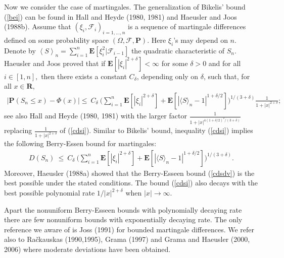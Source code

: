 \documentclass{gSTA2e}
\theoremstyle{plain}
\theoremstyle{definition}
\theoremstyle{remark}
\begin{document}
Now we consider the case of martingales. The  generalization of Bikelis' bound (\ref{bei}) can be found in   Hall and Heyde (1980, 1981) and Haeusler and Joos (1988b). Assume that $(\xi_{i}, \mathcal{F}_{i})_{i=1,...,n}$ is a sequence of martingale differences defined on some probability space
$(\Omega ,\mathcal{F},\mathbf{P})$. Here $\xi_{i}$'s may depend on $n$.  Denote by $\left\langle S\right\rangle_n=\sum_{i=1}^n\mathbf{E}[\xi _i^2|\mathcal{F} _{i-1}]$ the quadratic characteristic of $S_n$. Haeusler and Joos  proved that if  $\mathbf{E} [|\xi_i|^{2+\delta} ]< \infty$ for some $\delta > 0$ and for all $i \in [1,n],$ then there exists a constant $C_\delta$, depending only on $\delta$, such that, for all $x \in \mathbf{R},$
\begin{eqnarray}
  \Big|\mathbf{P}(S_n\leq x) - \Phi(x) \Big|  \leq \ C_\delta \ \bigg( \sum_{i=1}^n\mathbf{E} [ |\xi_i|^{2+\delta}] +  \mathbf{E} [|\langle S\rangle_{n}-1|^{1+\delta/2}] \bigg)^{1/(3+\delta)} \frac{1}{1+|x|^{2+\delta}}; \label{cdsi}
\end{eqnarray}
see also  Hall and Heyde (1980, 1981) with the larger factor $\frac{1}{1+|x|^{4(1+\delta/2)^2/(3+\delta)}}$ replacing $\frac{1}{1+|x|^{2+\delta}}$ of (\ref{cdsi}).
Similar to Bikelis' bound, inequality (\ref{cdsi}) implies the following Berry-Essen bound for martingales:
\begin{eqnarray}\label{cdsdv}
D(S_n) \ \leq \ C_\delta \ \bigg( \sum_{i=1}^n\mathbf{E} [ |\xi_i|^{2+\delta} ]+  \mathbf{E} [|\langle S\rangle_{n}-1|^{1+\delta/2} ]\bigg)^{1/(3+\delta)}.
\end{eqnarray}
Moreover, Haeusler (1988a) showed that the Berry-Esseen bound (\ref{cdsdv}) is the best possible under the stated conditions.
The bound (\ref{cdsi}) also decays with the best possible polynomial rate $1/|x|^{2+\delta}$ when $|x|\rightarrow \infty.$

Apart the nonuniform Berry-Esseen bounds with polynomially decaying rate there are few nonuniform bounds with exponentially decaying rate. The only reference we aware of is Joss (1991) for bounded martingale differences. We refer also to Ra\v{c}kauskas (1990,1995), Grama (1997) and Grama and Haeusler (2000, 2006) where moderate deviations have been obtained.
\end{document}

